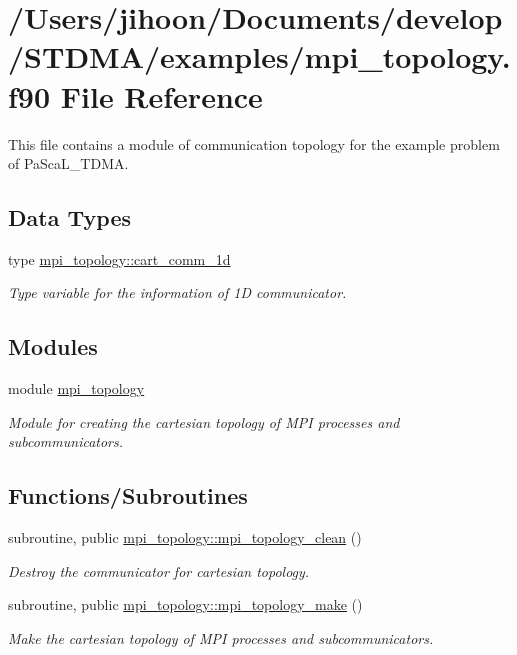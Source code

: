 \hypertarget{mpi__topology_8f90}{}\section{/\+Users/jihoon/\+Documents/develop/\+S\+T\+D\+M\+A/examples/mpi\+\_\+topology.f90 File Reference}
\label{mpi__topology_8f90}


This file contains a module of communication topology for the example problem of Pa\+Sca\+L\+\_\+\+T\+D\+MA.  


\subsection*{Data Types}
\begin{DoxyCompactItemize}
\item 
type \mbox{\hyperlink{structmpi__topology_1_1cart__comm__1d}{mpi\+\_\+topology\+::cart\+\_\+comm\+\_\+1d}}
\begin{DoxyCompactList}\small\item\em Type variable for the information of 1D communicator. \end{DoxyCompactList}\end{DoxyCompactItemize}
\subsection*{Modules}
\begin{DoxyCompactItemize}
\item 
module \mbox{\hyperlink{namespacempi__topology}{mpi\+\_\+topology}}
\begin{DoxyCompactList}\small\item\em Module for creating the cartesian topology of M\+PI processes and subcommunicators. \end{DoxyCompactList}\end{DoxyCompactItemize}
\subsection*{Functions/\+Subroutines}
\begin{DoxyCompactItemize}
\item 
subroutine, public \mbox{\hyperlink{namespacempi__topology_aa14e91baaec6d1c1082ebd5ac6e19128}{mpi\+\_\+topology\+::mpi\+\_\+topology\+\_\+clean}} ()
\begin{DoxyCompactList}\small\item\em Destroy the communicator for cartesian topology. \end{DoxyCompactList}\item 
subroutine, public \mbox{\hyperlink{namespacempi__topology_a8819f16f50aded913f17520a29d3ec4c}{mpi\+\_\+topology\+::mpi\+\_\+topology\+\_\+make}} ()
\begin{DoxyCompactList}\small\item\em Make the cartesian topology of M\+PI processes and subcommunicators. \end{DoxyCompactList}\end{DoxyCompactItemize}
